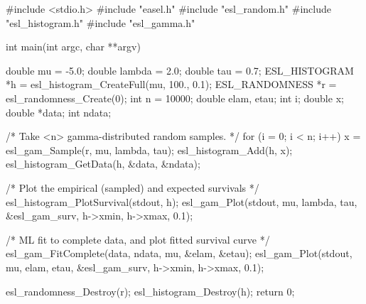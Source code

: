 \begin{cchunk}
#include <stdio.h>
#include "easel.h"
#include "esl_random.h"
#include "esl_histogram.h"
#include "esl_gamma.h"

int
main(int argc, char **argv)
{
  double mu         = -5.0;
  double lambda     = 2.0;
  double tau        = 0.7;
  ESL_HISTOGRAM  *h = esl_histogram_CreateFull(mu, 100., 0.1);
  ESL_RANDOMNESS *r = esl_randomness_Create(0);
  int    n          = 10000;
  double elam, etau;
  int    i;
  double x;
  double *data;
  int     ndata;

  /* Take <n> gamma-distributed random samples. */
  for (i = 0; i < n; i++)
    {
      x  =  esl_gam_Sample(r, mu, lambda, tau);
      esl_histogram_Add(h, x);
    }
  esl_histogram_GetData(h, &data, &ndata);

  /* Plot the empirical (sampled) and expected survivals */
  esl_histogram_PlotSurvival(stdout, h);
  esl_gam_Plot(stdout, mu, lambda, tau,
	       &esl_gam_surv,  h->xmin, h->xmax, 0.1);

  /* ML fit to complete data, and plot fitted survival curve */
  esl_gam_FitComplete(data, ndata, mu, &elam, &etau);
  esl_gam_Plot(stdout, mu, elam, etau,
	       &esl_gam_surv,  h->xmin, h->xmax, 0.1);

  esl_randomness_Destroy(r);
  esl_histogram_Destroy(h);
  return 0;
}
\end{cchunk}
